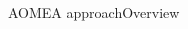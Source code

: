 \begin{frame}{AOMEA approach}{Overview}
\begin{columns}
        \begin{column}{0.5\textwidth}
            \centering
        \end{column}

    \end{columns}

\end{frame}

